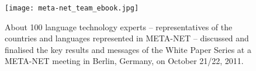 \renewcommand*{\figureformat}{}
\renewcommand*{\captionformat}{}

\begin{figure}[h]
  \center
  \texttt{[image: meta-net\_team\_ebook.jpg]}
  \caption{About 100 language technology experts -- representatives of the countries and languages represented in META-NET -- discussed and finalised the key results and messages of the White Paper Series at a META-NET meeting in Berlin, Germany, on October 21/22, 2011.}
  \medskip
\end{figure}

\cleardoublepage

\label{metamembers}


\small
